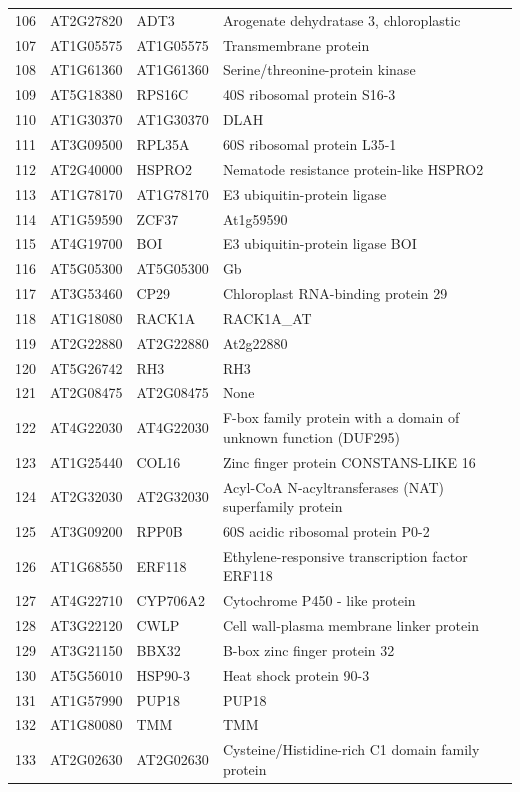 \documentclass[11pt]{article}
\begin{document}
\begin{center}
\begin{tabular}{rlll}
106 & AT2G27820 & ADT3 & Arogenate dehydratase 3, chloroplastic\\
107 & AT1G05575 & AT1G05575 & Transmembrane protein\\
108 & AT1G61360 & AT1G61360 & Serine/threonine-protein kinase\\
109 & AT5G18380 & RPS16C & 40S ribosomal protein S16-3\\
110 & AT1G30370 & AT1G30370 & DLAH\\
111 & AT3G09500 & RPL35A & 60S ribosomal protein L35-1\\
112 & AT2G40000 & HSPRO2 & Nematode resistance protein-like HSPRO2\\
113 & AT1G78170 & AT1G78170 & E3 ubiquitin-protein ligase\\
114 & AT1G59590 & ZCF37 & At1g59590\\
115 & AT4G19700 & BOI & E3 ubiquitin-protein ligase BOI\\
116 & AT5G05300 & AT5G05300 & Gb\\
117 & AT3G53460 & CP29 & Chloroplast RNA-binding protein 29\\
118 & AT1G18080 & RACK1A & RACK1A\_AT\\
119 & AT2G22880 & AT2G22880 & At2g22880\\
120 & AT5G26742 & RH3 & RH3\\
121 & AT2G08475 & AT2G08475 & None\\
122 & AT4G22030 & AT4G22030 & F-box family protein with a domain of unknown function (DUF295)\\
123 & AT1G25440 & COL16 & Zinc finger protein CONSTANS-LIKE 16\\
124 & AT2G32030 & AT2G32030 & Acyl-CoA N-acyltransferases (NAT) superfamily protein\\
125 & AT3G09200 & RPP0B & 60S acidic ribosomal protein P0-2\\
126 & AT1G68550 & ERF118 & Ethylene-responsive transcription factor ERF118\\
127 & AT4G22710 & CYP706A2 & Cytochrome P450 - like protein\\
128 & AT3G22120 & CWLP & Cell wall-plasma membrane linker protein\\
129 & AT3G21150 & BBX32 & B-box zinc finger protein 32\\
130 & AT5G56010 & HSP90-3 & Heat shock protein 90-3\\
131 & AT1G57990 & PUP18 & PUP18\\
132 & AT1G80080 & TMM & TMM\\
133 & AT2G02630 & AT2G02630 & Cysteine/Histidine-rich C1 domain family protein\\

\end{tabular}
\end{center}
\end{document}
